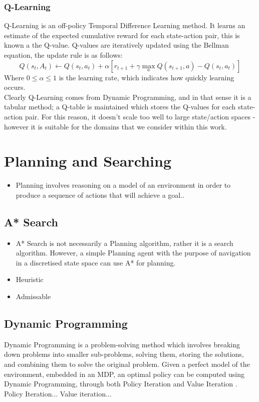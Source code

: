 \subsubsection{Q-Learning}
Q-Learning \cite{Watkins:1989, journals/ml/WatkinsD92} is an off-policy Temporal Difference Learning method. It learns an estimate of the expected cumulative reward for each state-action pair, this is known a the Q-value. Q-values are iteratively updated using the Bellman equation, the update rule is as follows:
$$Q(s_t,A_t) \leftarrow Q(s_t,a_t) + \alpha[r_{t+1} + \gamma \max_aQ(s_{t+1}, a) -Q(s_t,a_t)]$$
Where $0 \le \alpha \le 1$ is the learning rate, which indicates how quickly learning occurs.
\\Clearly Q-Learning comes from Dynamic Programming, and in that sense it is a tabular method; a Q-table is maintained which stores the Q-values for each state-action pair. For this reason, it doesn't scale too well to large state/action spaces - however it is suitable for the domains that we consider within this work.
\section{Planning and Searching}
\begin{itemize}
    \item Planning involves reasoning on a model of an environment in order to produce a sequence of actions that will achieve a goal.\cite{russelNorvig2003:aima}.
\end{itemize}
\subsection{A* Search}
\begin{itemize}
    \item A* Search \cite{4082128} is not necessarily a Planning algorithm, rather it is a search algorithm. However, a simple Planning agent with the purpose of navigation in a discretised state space can use A* for planning.
    \item Heuristic
    \item Admissable
\end{itemize}
\subsection{Dynamic Programming}
Dynamic Programming \cite{Bellman:1957, DBLP:books/lib/Bertsekas05} is a problem-solving method which involves breaking down problems into smaller sub-problems, solving them, storing the solutions, and combining them to solve the original problem. Given a perfect model of the environment, embedded in an MDP, an optimal policy can be computed using Dynamic Programming, through both Policy Iteration \cite{Bellman:1957, howard:dp} and Value Iteration \cite{Bellman:1957}. Policy Iteration... Value iteration...

